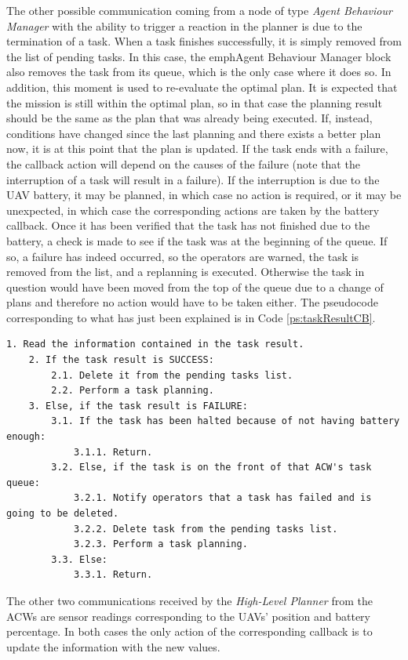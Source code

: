 \documentclass[fontsize=11pt, English=false, Español=true, Myfinal=true, twoside, numbers=noenddot]{scrbook}
\begin{document}
The other possible communication coming from a node of type \emph{Agent Behaviour Manager} with the ability to trigger a reaction in the planner is due to the termination of a task. When a task finishes successfully, it is simply removed from the list of pending tasks. In this case, the emph{Agent Behaviour Manager} block also removes the task from its queue, which is the only case where it does so. In addition, this moment is used to re-evaluate the optimal plan. It is expected that the mission is still within the optimal plan, so in that case the planning result should be the same as the plan that was already being executed. If, instead, conditions have changed since the last planning and there exists a better plan now, it is at this point that the plan is updated. If the task ends with a failure, the callback action will depend on the causes of the failure (note that the interruption of a task will result in a failure). If the interruption is due to the \gls{UAV} battery, it may be planned, in which case no action is required, or it may be unexpected, in which case the corresponding actions are taken by the battery callback. Once it has been verified that the task has not finished due to the battery, a check is made to see if the task was at the beginning of the queue. If so, a failure has indeed occurred, so the operators are warned, the task is removed from the list, and a replanning is executed. Otherwise the task in question would have been moved from the top of the queue due to a change of plans and therefore no action would have to be taken either. The pseudocode corresponding to what has just been explained is in Code \ref{ps:taskResultCB}.

\begin{lstlisting}[caption={Callback that runs when an \emph{Agent Behaviour Manager} sends a task result}, breaklines=true, label=ps:taskResultCB]
	1. Read the information contained in the task result.
	2. If the task result is SUCCESS:
		2.1. Delete it from the pending tasks list.
		2.2. Perform a task planning.
	3. Else, if the task result is FAILURE:
		3.1. If the task has been halted because of not having battery enough:
			3.1.1. Return.
		3.2. Else, if the task is on the front of that ACW's task queue:
			3.2.1. Notify operators that a task has failed and is going to be deleted.
			3.2.2. Delete task from the pending tasks list.
			3.2.3. Perform a task planning.
		3.3. Else:
			3.3.1. Return.
\end{lstlisting}

The other two communications received by the \emph{High-Level Planner} from the \glspl{ACW} are sensor readings corresponding to the \glspl{UAV}' position and battery percentage. In both cases the only action of the corresponding callback is to update the information with the new values.
\end{document}

